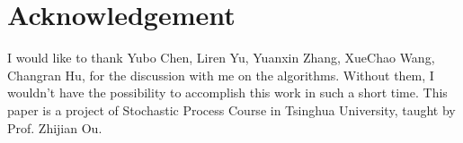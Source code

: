 \documentclass{sig-alternate-05-2015}
\begin{document}
\renewcommand{\baselinestretch}{1.1}
\balance

\small

\section{Acknowledgement} \label{sec:acknowledgement}
I would like to thank Yubo Chen, Liren Yu, Yuanxin Zhang, XueChao Wang, Changran Hu, for the discussion with me on the algorithms. Without them, I wouldn't have the possibility to accomplish this work in such a short time. This paper is a project of Stochastic Process Course in Tsinghua University, taught by Prof. Zhijian Ou.




	
\end{document}
